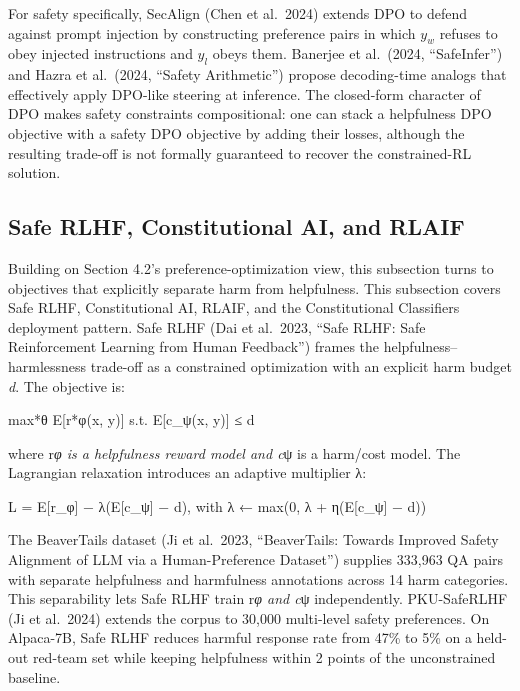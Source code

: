 \documentclass{article}
\begin{document}
For safety specifically, SecAlign (Chen et al.~2024) extends DPO to defend against prompt injection by constructing preference pairs in which \(y_w\) refuses to obey injected instructions and \(y_l\) obeys them. Banerjee et al.~(2024, ``SafeInfer'') and Hazra et al.~(2024, ``Safety Arithmetic'') propose decoding-time analogs that effectively apply DPO-like steering at inference. The closed-form character of DPO makes safety constraints compositional: one can stack a helpfulness DPO objective with a safety DPO objective by adding their losses, although the resulting trade-off is not formally guaranteed to recover the constrained-RL solution.

\subsection{Safe RLHF, Constitutional AI, and RLAIF}\label{safe-rlhf-constitutional-ai-and-rlaif}

Building on Section 4.2's preference-optimization view, this subsection turns to objectives that explicitly separate harm from helpfulness. This subsection covers Safe RLHF, Constitutional AI, RLAIF, and the Constitutional Classifiers deployment pattern. Safe RLHF (Dai et al.~2023, ``Safe RLHF: Safe Reinforcement Learning from Human Feedback'') frames the helpfulness--harmlessness trade-off as a constrained optimization with an explicit harm budget \emph{d}. The objective is:

max*θ E{[}r*φ(x, y){]} s.t. E{[}c\_ψ(x, y){]} ≤ d

where r\emph{φ is a helpfulness reward model and c}ψ is a harm/cost model. The Lagrangian relaxation introduces an adaptive multiplier λ:

L = E{[}r\_φ{]} − λ(E{[}c\_ψ{]} − d), with λ ← max(0, λ + η(E{[}c\_ψ{]} − d))

The BeaverTails dataset (Ji et al.~2023, ``BeaverTails: Towards Improved Safety Alignment of LLM via a Human-Preference Dataset'') supplies 333,963 QA pairs with separate helpfulness and harmfulness annotations across 14 harm categories. This separability lets Safe RLHF train r\emph{φ and c}ψ independently. PKU-SafeRLHF (Ji et al.~2024) extends the corpus to 30,000 multi-level safety preferences. On Alpaca-7B, Safe RLHF reduces harmful response rate from 47\% to 5\% on a held-out red-team set while keeping helpfulness within 2 points of the unconstrained baseline.
\end{document}
